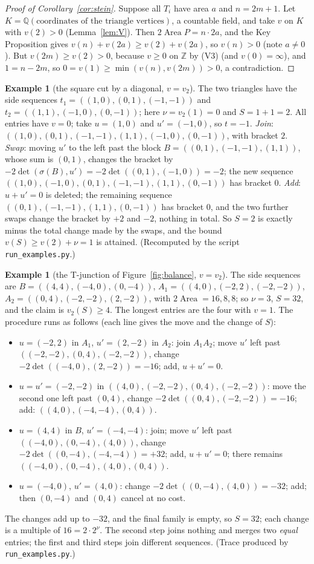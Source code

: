 \documentclass[11pt]{article}
\theoremstyle{definition}
\newtheorem{example}[theorem]{Example}
\newcommand{\Q}{\mathbb{Q}}
\newcommand{\Z}{\mathbb{Z}}
\newcommand{\sg}{\sigma}
\newcommand{\Area}{\operatorname{Area}}
\newcommand{\tL}[1]{\texttt{#1}}
\begin{document}
\begin{proof}[Proof of Corollary~\ref{cor:stein}]
Suppose all $T_i$ have area $a$ and $n=2m+1$. Let $K=\Q(\text{coordinates of the triangle
vertices})$, a countable field, and take $v$ on $K$ with $v(2)>0$ (Lemma~\ref{lem:V}). Then
$2\Area P=n\cdot2a$, and the Key Proposition gives $v(n)+v(2a)\ge v(2)+v(2a)$, so $v(n)>0$ (note
$a\ne0$). But $v(2m)\ge v(2)>0$, because $v\ge0$ on $\Z$ by (V3) (and $v(0)=\infty$), and $1=n-2m$,
so $0=v(1)\ge\min(v(n),v(2m))>0$, a contradiction.
\end{proof}

\begin{example}[the square cut by a diagonal, $v=v_2$]\label{ex:square}
The two triangles have the side sequences $t_1=((1,0),(0,1),(-1,-1))$ and
$t_2=((1,1),(-1,0),(0,-1))$; here $\nu=v_2(1)=0$ and $S=1+1=2$. All entries have $v=0$; take
$u=(1,0)$ and $u'=(-1,0)$, so $t=-1$. \emph{Join}:
$((1,0),(0,1),(-1,-1),(1,1),(-1,0),(0,-1))$, with bracket $2$. \emph{Swap}: moving $u'$ to the left
past the block $B=((0,1),(-1,-1),(1,1))$, whose sum is $(0,1)$, changes the bracket by
$-2\det(\sg(B),u')=-2\det((0,1),(-1,0))=-2$; the new sequence
$((1,0),(-1,0),(0,1),(-1,-1),(1,1),(0,-1))$ has bracket $0$. \emph{Add}: $u+u'=0$ is deleted; the
remaining sequence $((0,1),(-1,-1),(1,1),(0,-1))$ has bracket $0$, and the two further swaps change the
bracket by $+2$ and $-2$, nothing in total. So $S=2$ is exactly minus the total change made by the swaps, and the bound $v(S)\ge v(2)+\nu=1$
is attained. (Recomputed by the script \tL{run\_examples.py}.)
\end{example}

\begin{example}[the T-junction of Figure~\ref{fig:balance}, $v=v_2$]\label{ex:tj}
The side sequences are $B=((4,4),(-4,0),(0,-4))$, $A_1=((4,0),(-2,2),(-2,-2))$,
$A_2=((0,4),(-2,-2),(2,-2))$, with $2\Area=16,8,8$; so $\nu=3$, $S=32$, and the claim is
$v_2(S)\ge4$. The longest entries are the four with $v=1$. The procedure runs as follows (each line
gives the move and the change of $S$):
\begin{itemize}
\item $u=(-2,2)$ in $A_1$, $u'=(2,-2)$ in $A_2$: join $A_1A_2$; move $u'$ left past
$((-2,-2),(0,4),(-2,-2))$, change $-2\det((-4,0),(2,-2))=-16$; add, $u+u'=0$.
\item $u=u'=(-2,-2)$ in $((4,0),(-2,-2),(0,4),(-2,-2))$: move the second one left past $(0,4)$,
change $-2\det((0,4),(-2,-2))=-16$; add: $((4,0),(-4,-4),(0,4))$.
\item $u=(4,4)$ in $B$, $u'=(-4,-4)$: join; move $u'$ left past $((-4,0),(0,-4),(4,0))$, change
$-2\det((0,-4),(-4,-4))=+32$; add, $u+u'=0$; there remains $((-4,0),(0,-4),(4,0),(0,4))$.
\item $u=(-4,0)$, $u'=(4,0)$: change $-2\det((0,-4),(4,0))=-32$; add; then $(0,-4)$ and $(0,4)$
cancel at no cost.
\end{itemize}
The changes add up to $-32$, and the final family is empty, so $S=32$; each change is a multiple of
$16=2\cdot2^\nu$. The second step joins nothing and merges two \emph{equal} entries; the first and
third steps join different sequences. (Trace produced by \tL{run\_examples.py}.)
\end{example}
\end{document}
